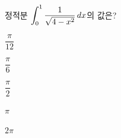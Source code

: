 \hspace*{2mm}\begin{minipage}[t]{\dimexpr\linewidth-2mm\relax}\vspace{0pt}
정적분 $\displaystyle\int_{0}^{1}\dfrac{1}{\sqrt{4-x^2}}\mkern3mu dx$의 값은?
\begin{choices32}{\rule[-3ex]{0pt}{8ex}$\dfrac{\pi}{12}$}{\rule[-3ex]{0pt}{8ex}$\dfrac{\pi}{6}$}{\rule[-3ex]{0pt}{8ex}$\dfrac{\pi}{2}$}{\rule[-3ex]{0pt}{8ex}$\pi$}{\rule[-3ex]{0pt}{8ex}$2\pi$}\end{choices32}\end{minipage}
